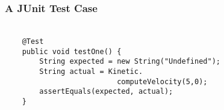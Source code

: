 
\begin{frame}[fragile]
  \frametitle{\vspace*{.5in}A JUnit Test Case}
  \framesubtitle{}

  \normalsize
  \hspace*{-.65in}
  \begin{minipage}{5in}
    \Large
    \vspace*{-.25in}
    \begin{verbatim}

    @Test
    public void testOne() {
        String expected = new String("Undefined");
        String actual = Kinetic.
                          computeVelocity(5,0);
        assertEquals(expected, actual);
    }

    \end{verbatim}
  \end{minipage}
  \normalsize

\end{frame}
